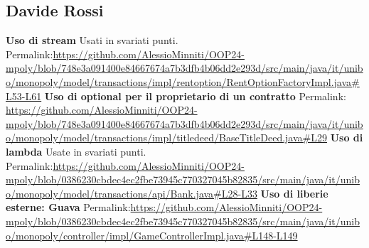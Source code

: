 \subsection{Davide Rossi}
\textbf{Uso di stream}\newline
\newline
Usati in svariati punti. Permalink:\url{https://github.com/AlessioMinniti/OOP24-mpoly/blob/748e3a091400e84667674a7b3dfb4b06dd2e293d/src/main/java/it/unibo/monopoly/model/transactions/impl/rentoption/RentOptionFactoryImpl.java#L53-L61}\newline
\newline
\textbf{Uso di optional per il proprietario di un contratto}\newline
\newline
Permalink: \url{https://github.com/AlessioMinniti/OOP24-mpoly/blob/748e3a091400e84667674a7b3dfb4b06dd2e293d/src/main/java/it/unibo/monopoly/model/transactions/impl/titledeed/BaseTitleDeed.java#L29}\newline
\newline
\textbf{Uso di lambda}\newline
\newline
Usate in svariati punti. Permalink:\url{https://github.com/AlessioMinniti/OOP24-mpoly/blob/0386230cbdec4ec2fbe73945c770327045b82835/src/main/java/it/unibo/monopoly/model/transactions/api/Bank.java#L28-L33}\newline
\newline
\textbf{Uso di liberie esterne: Guava}\newline
Permalink:\url{https://github.com/AlessioMinniti/OOP24-mpoly/blob/0386230cbdec4ec2fbe73945c770327045b82835/src/main/java/it/unibo/monopoly/controller/impl/GameControllerImpl.java#L148-L149}\newline